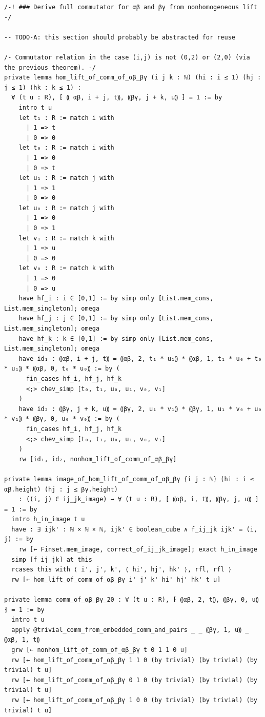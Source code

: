 \documentclass[10pt,a4paper]{article}
\begin{document}
\begin{Verbatim}
/-! ### Derive full commutator for αβ and βγ from nonhomogeneous lift -/

-- TODO-A: this section should probably be abstracted for reuse

/- Commutator relation in the case (i,j) is not (0,2) or (2,0) (via the previous theorem). -/
private lemma hom_lift_of_comm_of_αβ_βγ (i j k : ℕ) (hi : i ≤ 1) (hj : j ≤ 1) (hk : k ≤ 1) :
  ∀ (t u : R), ⁅ ⸨ αβ, i + j, t⸩, ⸨βγ, j + k, u⸩ ⁆ = 1 := by
    intro t u
    let t₁ : R := match i with
      | 1 => t
      | 0 => 0
    let t₀ : R := match i with
      | 1 => 0
      | 0 => t
    let u₁ : R := match j with
      | 1 => 1
      | 0 => 0
    let u₀ : R := match j with
      | 1 => 0
      | 0 => 1
    let v₁ : R := match k with
      | 1 => u
      | 0 => 0
    let v₀ : R := match k with
      | 1 => 0
      | 0 => u
    have hf_i : i ∈ [0,1] := by simp only [List.mem_cons, List.mem_singleton]; omega
    have hf_j : j ∈ [0,1] := by simp only [List.mem_cons, List.mem_singleton]; omega
    have hf_k : k ∈ [0,1] := by simp only [List.mem_cons, List.mem_singleton]; omega
    have id₁ : ⸨αβ, i + j, t⸩ = ⸨αβ, 2, t₁ * u₁⸩ * ⸨αβ, 1, t₁ * u₀ + t₀ * u₁⸩ * ⸨αβ, 0, t₀ * u₀⸩ := by (
      fin_cases hf_i, hf_j, hf_k
      <;> chev_simp [t₀, t₁, u₀, u₁, v₀, v₁]
    )
    have id₂ : ⸨βγ, j + k, u⸩ = ⸨βγ, 2, u₁ * v₁⸩ * ⸨βγ, 1, u₁ * v₀ + u₀ * v₁⸩ * ⸨βγ, 0, u₀ * v₀⸩ := by (
      fin_cases hf_i, hf_j, hf_k
      <;> chev_simp [t₀, t₁, u₀, u₁, v₀, v₁]
    )
    rw [id₁, id₂, nonhom_lift_of_comm_of_αβ_βγ]

private lemma image_of_hom_lift_of_comm_of_αβ_βγ {i j : ℕ} (hi : i ≤ αβ.height) (hj : j ≤ βγ.height)
    : ((i, j) ∈ ij_jk_image) → ∀ (t u : R), ⁅ ⸨αβ, i, t⸩, ⸨βγ, j, u⸩ ⁆ = 1 := by
  intro h_in_image t u
  have : ∃ ijk' : ℕ × ℕ × ℕ, ijk' ∈ boolean_cube ∧ f_ij_jk ijk' = (i, j) := by
    rw [← Finset.mem_image, correct_of_ij_jk_image]; exact h_in_image
  simp [f_ij_jk] at this
  rcases this with ⟨ i', j', k', ⟨ hi', hj', hk' ⟩, rfl, rfl ⟩
  rw [← hom_lift_of_comm_of_αβ_βγ i' j' k' hi' hj' hk' t u]

private lemma comm_of_αβ_βγ_20 : ∀ (t u : R), ⁅ ⸨αβ, 2, t⸩, ⸨βγ, 0, u⸩ ⁆ = 1 := by
  intro t u
  apply @trivial_comm_from_embedded_comm_and_pairs _ _ ⸨βγ, 1, u⸩ _ ⸨αβ, 1, t⸩
  grw [← nonhom_lift_of_comm_of_αβ_βγ t 0 1 1 0 u]
  rw [← hom_lift_of_comm_of_αβ_βγ 1 1 0 (by trivial) (by trivial) (by trivial) t u]
  rw [← hom_lift_of_comm_of_αβ_βγ 0 1 0 (by trivial) (by trivial) (by trivial) t u]
  rw [← hom_lift_of_comm_of_αβ_βγ 1 0 0 (by trivial) (by trivial) (by trivial) t u]


\end{Verbatim}
\end{document}
